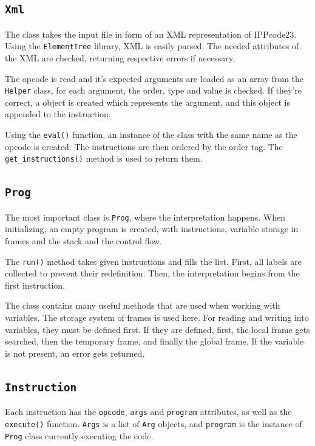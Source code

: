 \documentclass[11pt,a4paper]{article}
\begin{document}
\subsection{\texttt{Xml}}

The class takes the input file in form of an XML representation of IPPcode23. Using the \verb|ElementTree| 
library, XML is easily parsed. The needed attributes of the XML are checked, returning respective errors if
necessary.

The opcode is read and it's expected arguments are loaded as an array from the \verb|Helper| class,
for each argument, the order, type and value is checked. If they're correct, a object is created which
represents the argument, and this object is appended to the instruction.

Using the \verb|eval()| function, an instance of the class with the same name as the opcode is created. The instructions are then ordered by the order tag. The \verb|get_instructions()| method is used to return them.


\subsection{\texttt{Prog}}

The most important class is \verb|Prog|, where the interpretation happens. When initializing, an empty program
is created, with instructions, variable storage in frames and the stack and the control flow.

The \verb|run()| method takes given instructions and fills the list. First, all labels are collected to prevent
their redefinition. Then, the interpretation begins from the first instruction.

The class contains many useful methods that are used when working with variables. The storage system of frames
is used here. For reading and writing into variables, they must be defined first. If they are defined, first,
the local frame gets searched, then the temporary frame, and finally the global frame. If the variable is not
present, an error gets returned.


\subsection{\texttt{Instruction}}

Each instruction has the \verb|opcode|, \verb|args| and \verb|program| attributes, as well as the \verb|execute()| function. \verb|Args| is a list of \verb|Arg| objects, and \verb|program| is the
instance of \verb|Prog| class currently executing the code.
\end{document}
